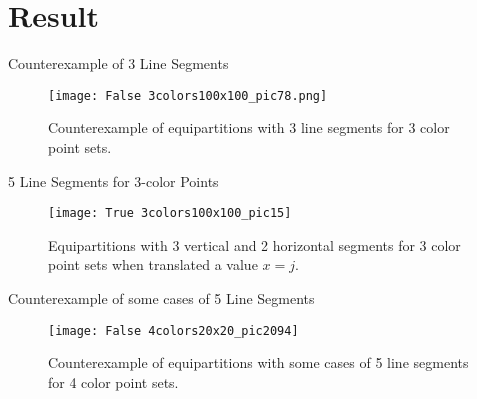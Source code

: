 \documentclass[11pt,aspectratio=43,xcolor={dvipsnames},notheorems]{beamer}
\theoremstyle{definition}
\theoremstyle{plain}
\theoremstyle{remark}
\begin{document}
\section{Result}
\begin{frame}{Counterexample of 3 Line Segments}
\begin{figure}[!ht]
    \centering
    \texttt{[image: False 3colors100x100\_pic78.png]}
    \caption{Counterexample of equipartitions with 3 line segments for 3 color point sets.}
    \label{ex6}
\end{figure}
\end{frame}
\begin{frame}{5 Line Segments for 3-color Points}
\begin{figure}[!ht]
    \centering
    \texttt{[image: True 3colors100x100\_pic15]}
    \caption{Equipartitions with 3 vertical and 2 horizontal segments for 3 color point sets when translated a value $x=j$.}
    \label{ex13}
\end{figure}
\end{frame}
\begin{frame}{Counterexample of some cases of 5 Line Segments}
\begin{figure}[!ht]
    \centering
    \texttt{[image: False 4colors20x20\_pic2094]}
    \caption{Counterexample of equipartitions with some cases of 5 line segments for 4 color point sets.}
    \label{ex14}
\end{figure}
\end{frame}
\end{document}
